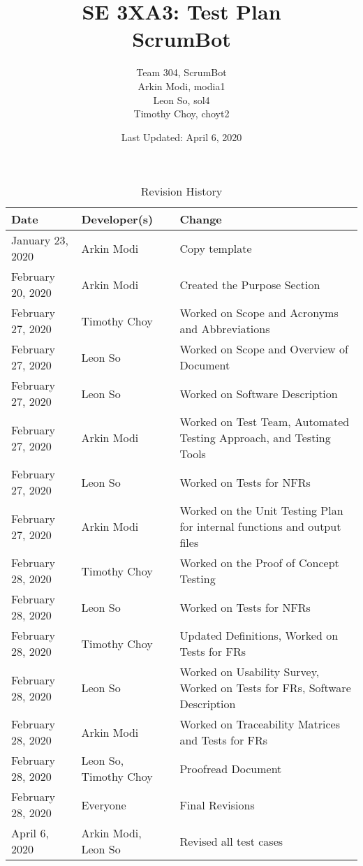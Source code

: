 \documentclass[12pt, titlepage]{article}
\title{SE 3XA3: Test Plan\\ScrumBot}
\author{
    Team 304, ScrumBot
        \\ Arkin Modi, modia1
        \\ Leon So, sol4
        \\ Timothy Choy, choyt2
}
\date{Last Updated: April 6, 2020}
\begin{document}
\newpage
\maketitle

\tableofcontents
\listoftables
\listoffigures

\newpage

\begin{table}[!hbp]
    \caption{Revision History} \label{TblRevisionHistory}
    \begin{tabularx}{\textwidth}{llX}
        \toprule
            \textbf{Date} & \textbf{Developer(s)} & \textbf{Change}\\
        \midrule
            January 23, 2020 & Arkin Modi & Copy template\\
            February 20, 2020 & Arkin Modi & Created the Purpose Section\\
            February 27, 2020 & Timothy Choy & Worked on Scope and Acronyms and Abbreviations\\
            February 27, 2020 & Leon So & Worked on Scope and Overview of Document\\
            February 27, 2020 & Leon So & Worked on Software Description\\
            February 27, 2020 & Arkin Modi & Worked on Test Team, Automated Testing Approach, and Testing Tools\\
            February 27, 2020 & Leon So & Worked on Tests for NFRs\\
            February 27, 2020 & Arkin Modi & Worked on the Unit Testing Plan for internal functions and output files\\
            February 28, 2020 & Timothy Choy & Worked on the Proof of Concept Testing\\
            February 28, 2020 & Leon So & Worked on Tests for NFRs\\
            February 28, 2020 & Timothy Choy & Updated Definitions, Worked on Tests for FRs\\
            February 28, 2020 & Leon So & Worked on Usability Survey, Worked on Tests for FRs, Software Description\\
            February 28, 2020 & Arkin Modi & Worked on Traceability Matrices and Tests for FRs\\
            February 28, 2020 & Leon So, Timothy Choy & Proofread Document\\
            February 28, 2020 & Everyone & Final Revisions\\
            April 6, 2020 & Arkin Modi, Leon So & Revised all test cases\\
        \bottomrule
    \end{tabularx}
\end{table}
\end{document}

